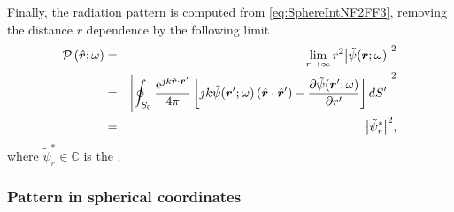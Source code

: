 \par Finally, the radiation pattern is computed from \eqref{eq:SphereIntNF2FF3}, removing the distance $r$ dependence by the following limit
\begin{eqnarray}
\label{eq:SphereIntNF2FFPattern}
\mathcal{P} \left (\hat{\mbfit{r}}; \omega \right ) & = &\lim_{r \to \infty}{r^2 {\left | \tilde{\psi}(\mbfit{r}; \omega) \right |}^2 } \nonumber \\
& = & { \left | \oint_{S_0} \frac{\mrm{e}^{jk \hat{\mbfit{r}} \cdot \mbfit{r'}}}{4 \pi}  \left [ jk \tilde{\psi}(\mbfit{r'}; \omega)  \left ( \hat{\mbfit{r}} \cdot \hat{\mbfit{r}}' \right )  -  \frac{\partial{\tilde{\psi}(\mbfit{r'}; \omega)}}{\partial{r'}} \right ] dS' \right | }^2 \nonumber \\
& = & {\left |  \tilde{\psi}_r^* \right |}^2,
\end{eqnarray} where $ \tilde{\psi}_r^* \in \mathbb{C}$ is the .

\subsubsection{Pattern in spherical coordinates}

